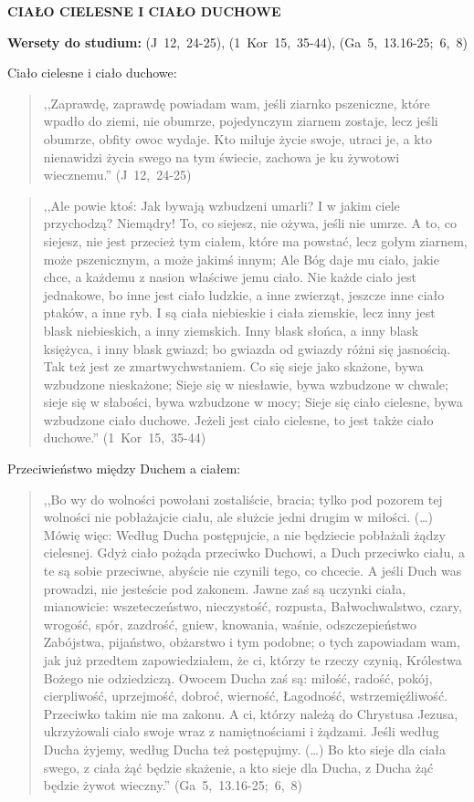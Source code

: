 \documentclass[10pt,a4paper,oneside]{article}
\begin{document}
\centerline{\textbf{\MakeUppercase{Ciało cielesne i ciało duchowe}}}
\begin{center}
\textbf{Wersety do studium:} \mbox{(J 12, 24-25)}, \mbox{(1 Kor 15, 35-44)}, \mbox{(Ga 5, 13.16-25; 6, 8)}
\end{center}
Ciało cielesne i ciało duchowe:
\begin{quote}
,,Zaprawdę, zaprawdę powiadam wam, jeśli ziarnko pszeniczne, które wpadło do ziemi, nie obumrze, pojedynczym ziarnem zostaje, lecz jeśli obumrze, obfity owoc wydaje. Kto miłuje życie swoje, utraci je, a kto nienawidzi życia swego na tym świecie, zachowa je ku żywotowi wiecznemu.'' \mbox{(J 12, 24-25)}
\end{quote}
\begin{quote}
,,Ale powie ktoś: Jak bywają wzbudzeni umarli? I w jakim ciele przychodzą? Niemądry! To, co siejesz, nie ożywa, jeśli nie umrze. A to, co siejesz, nie jest przecież tym ciałem, które ma powstać, lecz gołym ziarnem, może pszenicznym, a może jakimś innym; Ale Bóg daje mu ciało, jakie chce, a każdemu z nasion właściwe jemu ciało. Nie każde ciało jest jednakowe, bo inne jest ciało ludzkie, a inne zwierząt, jeszcze inne ciało ptaków, a inne ryb. I są ciała niebieskie i ciała ziemskie, lecz inny jest blask niebieskich, a inny ziemskich. Inny blask słońca, a inny blask księżyca, i inny blask gwiazd; bo gwiazda od gwiazdy różni się jasnością. Tak też jest ze zmartwychwstaniem. Co się sieje jako skażone, bywa wzbudzone nieskażone; Sieje się w niesławie, bywa wzbudzone w chwale; sieje się w słabości, bywa wzbudzone w mocy; Sieje się ciało cielesne, bywa wzbudzone ciało duchowe. Jeżeli jest ciało cielesne, to jest także ciało duchowe.'' \mbox{(1 Kor 15, 35-44)}
\end{quote}

Przeciwieństwo między Duchem a ciałem:
\begin{quote}
,,Bo wy do wolności powołani zostaliście, bracia; tylko pod pozorem tej wolności nie pobłażajcie ciału, ale służcie jedni drugim w miłości. (\ldots) Mówię więc: Według Ducha postępujcie, a nie będziecie pobłażali żądzy cielesnej. Gdyż ciało pożąda przeciwko Duchowi, a Duch przeciwko ciału, a te są sobie przeciwne, abyście nie czynili tego, co chcecie. A jeśli Duch was prowadzi, nie jesteście pod zakonem. Jawne zaś są uczynki ciała, mianowicie: wszeteczeństwo, nieczystość, rozpusta, Bałwochwalstwo, czary, wrogość, spór, zazdrość, gniew, knowania, waśnie, odszczepieństwo Zabójstwa, pijaństwo, obżarstwo i tym podobne; o tych zapowiadam wam, jak już przedtem zapowiedziałem, że ci, którzy te rzeczy czynią, Królestwa Bożego nie odziedziczą. Owocem Ducha zaś są: miłość, radość, pokój, cierpliwość, uprzejmość, dobroć, wierność, Łagodność, wstrzemięźliwość. Przeciwko takim nie ma zakonu. A ci, którzy należą do Chrystusa Jezusa, ukrzyżowali ciało swoje wraz z namiętnościami i żądzami. Jeśli według Ducha żyjemy, według Ducha też postępujmy. (\ldots) Bo kto sieje dla ciała swego, z ciała żąć będzie skażenie, a kto sieje dla Ducha, z Ducha żąć będzie żywot wieczny.'' \mbox{(Ga 5, 13.16-25; 6, 8)}
\end{quote}
\end{document}
